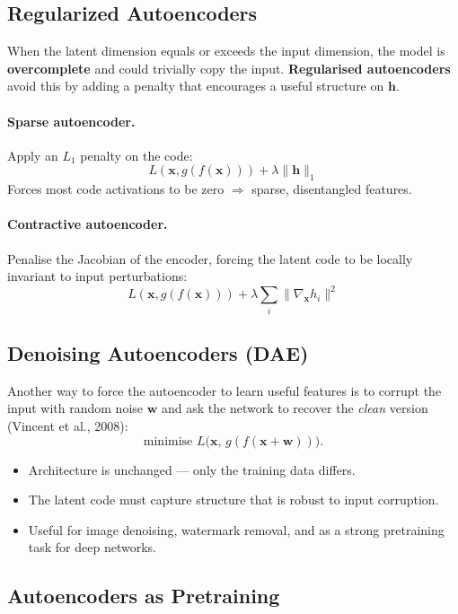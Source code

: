 \documentclass[11pt,a4paper]{article}
\theoremstyle{definition}
\theoremstyle{plain}
\theoremstyle{remark}
\begin{document}
\subsection{Regularized Autoencoders}

When the latent dimension equals or exceeds the input dimension, the model is \textbf{overcomplete} and could trivially copy the input. \textbf{Regularised autoencoders} avoid this by adding a penalty that encourages a useful structure on $\mathbf{h}$.

\paragraph{Sparse autoencoder.} Apply an $L_1$ penalty on the code:
\[
    L(\mathbf{x}, g(f(\mathbf{x}))) + \lambda \|\mathbf{h}\|_1
\]
Forces most code activations to be zero $\Rightarrow$ sparse, disentangled features.

\paragraph{Contractive autoencoder.} Penalise the Jacobian of the encoder, forcing the latent code to be locally invariant to input perturbations:
\[
    L(\mathbf{x}, g(f(\mathbf{x}))) + \lambda \sum_i \|\nabla_{\mathbf{x}} h_i\|^2
\]

\subsection{Denoising Autoencoders (DAE)}

Another way to force the autoencoder to learn useful features is to corrupt the input with random noise $\mathbf{w}$ and ask the network to recover the \emph{clean} version (Vincent et al., 2008):
\[
    \text{minimise } L\bigl(\mathbf{x},\, g(f(\mathbf{x} + \mathbf{w}))\bigr).
\]
\begin{itemize}
    \item Architecture is unchanged --- only the training data differs.
    \item The latent code must capture structure that is robust to input corruption.
    \item Useful for image denoising, watermark removal, and as a strong pretraining task for deep networks.
\end{itemize}

\subsection{Autoencoders as Pretraining}
\end{document}
